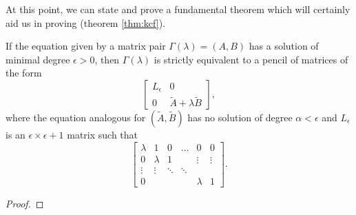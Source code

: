 At this point, we can state and prove a fundamental theorem which will certainly aid us
in proving  (theorem \ref{thm:kcf}).

\begin{theorem}
    If the equation given by a matrix pair \(\Gamma(\lambda) = (A, B)\) has a solution of minimal
    degree \(\epsilon > 0\), then \(\Gamma(\lambda)\) is strictly equivalent to a pencil of matrices of the form
    \[
        \begin{bmatrix}
            L_{\epsilon} & 0 \\
            0 & \tilde{A} + \lambda \tilde{B}
        \end{bmatrix},
    \]
    where the equation analogous for \((\tilde{A}, \tilde{B})\) has no solution of degree \(\alpha < \epsilon\) and
    \(L_{\epsilon}\) is an \(\epsilon \times \epsilon + 1\) matrix such that
    \[
        \begin{bmatrix}
            \lambda & 1       & 0     & \hdots & 0       &    0   \\
            0       & \lambda & 1     &        & \vdots  & \vdots \\
            \vdots  & \vdots & \ddots & \ddots \\
            0       &        &        &        & \lambda & 1
        \end{bmatrix}.
    \]
\end{theorem}

\begin{proof}
    
\end{proof}